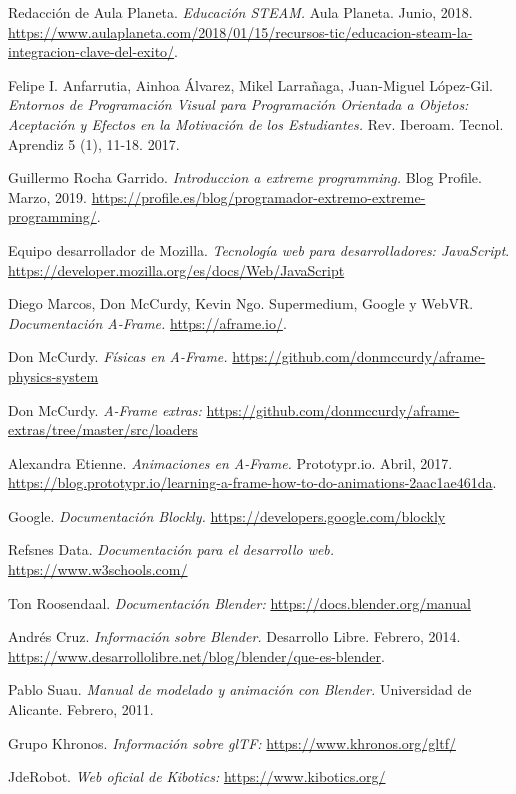 \begin{thebibliography}{99}
     Redacción de Aula Planeta.
    \textit{Educación STEAM.} 
    Aula Planeta. Junio, 2018. \url{https://www.aulaplaneta.com/2018/01/15/recursos-tic/educacion-steam-la-integracion-clave-del-exito/}.
    
    Felipe I. Anfarrutia, Ainhoa Álvarez, Mikel Larrañaga, Juan-Miguel López-Gil. \textit{Entornos de Programación Visual para Programación Orientada a Objetos: Aceptación y Efectos en la Motivación de los Estudiantes.} Rev. Iberoam. Tecnol. Aprendiz 5 (1), 11-18. 2017.
    
    Guillermo Rocha Garrido.
    \textit{Introduccion a extreme programming.} Blog Profile.
    Marzo, 2019.
    \url{https://profile.es/blog/programador-extremo-extreme-programming/}. 
  
    Equipo desarrollador de Mozilla.
    \textit{Tecnología web para desarrolladores: JavaScript}.
    \url{https://developer.mozilla.org/es/docs/Web/JavaScript}

    Diego Marcos, Don McCurdy, Kevin Ngo. Supermedium, Google y WebVR.
    \textit{Documentación A-Frame.}
    \url{https://aframe.io/}. 
    
    Don McCurdy.
    \textit{Físicas en A-Frame.}
    \url{https://github.com/donmccurdy/aframe-physics-system}
    
    Don McCurdy.
    \textit{A-Frame extras: }
    \url{https://github.com/donmccurdy/aframe-extras/tree/master/src/loaders}
    
    Alexandra Etienne.
    \textit{Animaciones en A-Frame.}
    Prototypr.io. Abril, 2017.
    \url{https://blog.prototypr.io/learning-a-frame-how-to-do-animations-2aac1ae461da}. 

    Google.
    \textit{Documentación Blockly.}
    \url{https://developers.google.com/blockly}
    
    Refsnes Data.
    \textit{Documentación para el desarrollo web.}
    \url{https://www.w3schools.com/}
    
    Ton Roosendaal.
    \textit{Documentación Blender: }
    \url{https://docs.blender.org/manual}
    
    Andrés Cruz.
    \textit{Información sobre Blender.}
     Desarrollo Libre. Febrero, 2014.
    \url{https://www.desarrollolibre.net/blog/blender/que-es-blender}.
    
    Pablo Suau.
    \textit{Manual de modelado y animación con Blender.}  Universidad de Alicante. Febrero, 2011.
    
    Grupo Khronos.
    \textit{Información sobre glTF: }
    \url{https://www.khronos.org/gltf/}
   
   JdeRobot.
    \textit{Web oficial de Kibotics:}  
    \url{https://www.kibotics.org/}

\end{thebibliography}